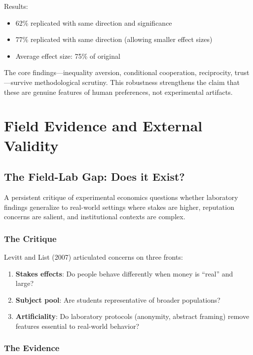 \documentclass[12pt,oneside]{book}
\begin{document}
Results:
\begin{itemize}
  \item 62\% replicated with same direction and significance
  \item 77\% replicated with same direction (allowing smaller effect sizes)
  \item Average effect size: 75\% of original
\end{itemize}

The core findings—inequality aversion, conditional cooperation, reciprocity, trust—survive
methodological scrutiny. This robustness strengthens the claim that these are genuine
features of human preferences, not experimental artifacts.

\chapter{Field Evidence and External Validity}
\label{sec:field}

\section{The Field-Lab Gap: Does it Exist?}

A persistent critique of experimental economics questions whether laboratory findings generalize
to real-world settings where stakes are higher, reputation concerns are salient, and institutional
contexts are complex.

\subsection{The Critique}

Levitt and List (2007) articulated concerns on three fronts:

\begin{enumerate}
  \item \textbf{Stakes effects}: Do people behave differently when money is ``real'' and large?
  \item \textbf{Subject pool}: Are students representative of broader populations?
  \item \textbf{Artificiality}: Do laboratory protocols (anonymity, abstract framing) remove features
        essential to real-world behavior?
\end{enumerate}

\subsection{The Evidence}
\end{document}
